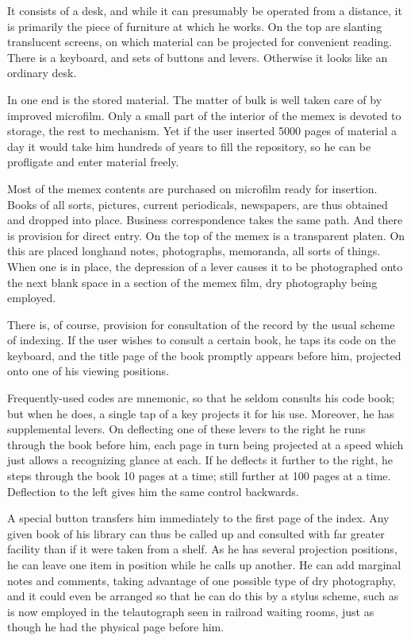\documentclass[]{book}
\theoremstyle{definition}
\theoremstyle{definition}
\theoremstyle{definition}
\theoremstyle{remark}
\begin{document}
It consists of a desk, and while it can presumably be operated from a
distance, it is primarily the piece of furniture at which he works. On
the top are slanting translucent screens, on which material can be
projected for convenient reading. There is a keyboard, and sets of
buttons and levers. Otherwise it looks like an ordinary desk.

In one end is the stored material. The matter of bulk is well taken care
of by improved microfilm. Only a small part of the interior of the memex
is devoted to storage, the rest to mechanism. Yet if the user inserted
5000 pages of material a day it would take him hundreds of years to fill
the repository, so he can be profligate and enter material freely.

Most of the memex contents are purchased on microfilm ready for
insertion. Books of all sorts, pictures, current periodicals,
newspapers, are thus obtained and dropped into place. Business
correspondence takes the same path. And there is provision for direct
entry. On the top of the memex is a transparent platen. On this are
placed longhand notes, photographs, memoranda, all sorts of things. When
one is in place, the depression of a lever causes it to be photographed
onto the next blank space in a section of the memex film, dry
photography being employed.

There is, of course, provision for consultation of the record by the
usual scheme of indexing. If the user wishes to consult a certain book,
he taps its code on the keyboard, and the title page of the book
promptly appears before him, projected onto one of his viewing
positions.

Frequently-used codes are mnemonic, so that he seldom consults his code
book; but when he does, a single tap of a key projects it for his use.
Moreover, he has supplemental levers. On deflecting one of these levers
to the right he runs through the book before him, each page in turn
being projected at a speed which just allows a recognizing glance at
each. If he deflects it further to the right, he steps through the book
10 pages at a time; still further at 100 pages at a time. Deflection to
the left gives him the same control backwards.

A special button transfers him immediately to the first page of the
index. Any given book of his library can thus be called up and consulted
with far greater facility than if it were taken from a shelf. As he has
several projection positions, he can leave one item in position while he
calls up another. He can add marginal notes and comments, taking
advantage of one possible type of dry photography, and it could even be
arranged so that he can do this by a stylus scheme, such as is now
employed in the telautograph seen in railroad waiting rooms, just as
though he had the physical page before him.
\end{document}
